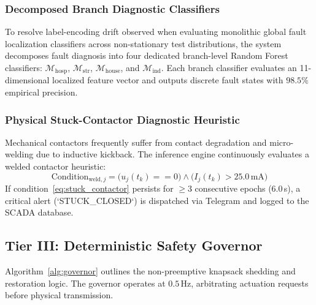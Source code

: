 \documentclass[journal,10pt,twocolumn]{IEEEtran}
\begin{document}
\subsubsection{Decomposed Branch Diagnostic Classifiers}
To resolve label-encoding drift observed when evaluating monolithic global fault localization classifiers across non-stationary test distributions, the system decomposes fault diagnosis into four dedicated branch-level Random Forest classifiers: $\mathcal{M}_{\text{hosp}}$, $\mathcal{M}_{\text{str}}$, $\mathcal{M}_{\text{house}}$, and $\mathcal{M}_{\text{ind}}$. Each branch classifier evaluates an 11-dimensional localized feature vector and outputs discrete fault states with $98.5\%$ empirical precision.

\subsubsection{Physical Stuck-Contactor Diagnostic Heuristic}
Mechanical contactors frequently suffer from contact degradation and micro-welding due to inductive kickback. The inference engine continuously evaluates a welded contactor heuristic:
\begin{equation}
\text{Condition}_{\text{weld}, j} = \big(u_j(t_k) == 0\big) \land \big(I_j(t_k) > 25.0\,\text{mA}\big)
\label{eq:stuck_contactor}
\end{equation}
If condition~\eqref{eq:stuck_contactor} persists for $\ge 3$ consecutive epochs ($6.0$\,s), a critical alert (`STUCK_CLOSED`) is dispatched via Telegram and logged to the SCADA database.

\subsection{Tier III: Deterministic Safety Governor}
Algorithm~\ref{alg:governor} outlines the non-preemptive knapsack shedding and restoration logic. The governor operates at $0.5$\,Hz, arbitrating actuation requests before physical transmission.
\end{document}
